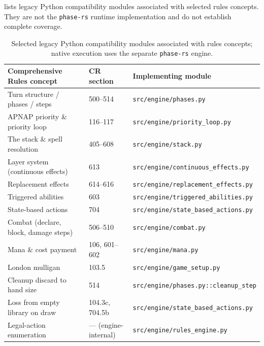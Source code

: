 \documentclass[11pt,a4paper]{article}
\theoremstyle{definition}
\theoremstyle{plain}
\begin{document}
 lists legacy Python compatibility modules associated with selected rules concepts. They are not the \texttt{phase-rs} runtime implementation and do not establish complete coverage.

\begin{table}[t]
\centering
\small
\setlength{\tabcolsep}{4pt}
\renewcommand{\arraystretch}{1.05}
\begin{tabular}{@{}p{} p{} p{}@{}}
\toprule
\textbf{Comprehensive Rules concept} & \textbf{CR section} & \textbf{Implementing module} \\
\midrule
Turn structure / phases / steps          & 500--514         & \texttt{src/engine/phases.py} \\
APNAP priority \& priority loop          & 116--117         & \texttt{src/engine/priority\_loop.py} \\
The stack \& spell resolution            & 405--608         & \texttt{src/engine/stack.py} \\
Layer system (continuous effects)        & 613              & \texttt{src/engine/continuous\_effects.py} \\
Replacement effects                      & 614--616         & \texttt{src/engine/replacement\_effects.py} \\
Triggered abilities                      & 603              & \texttt{src/engine/triggered\_abilities.py} \\
State-based actions                      & 704              & \texttt{src/engine/state\_based\_actions.py} \\
Combat (declare, block, damage steps)    & 506--510         & \texttt{src/engine/combat.py} \\
Mana \& cost payment                     & 106, 601--602    & \texttt{src/engine/mana.py} \\
London mulligan                          & 103.5            & \texttt{src/engine/game\_setup.py} \\
Cleanup discard to hand size             & 514              & \texttt{src/engine/phases.py::cleanup\_step} \\
Loss from empty library on draw          & 104.3c, 704.5b   & \texttt{src/engine/state\_based\_actions.py} \\
Legal-action enumeration                 & --- (engine-internal) & \texttt{src/engine/rules\_engine.py} \\
\bottomrule
\end{tabular}
\caption{Selected legacy Python compatibility modules associated with rules concepts; native execution uses the separate \texttt{phase-rs} engine.}
\label{tab:engine-pointers}
\end{table}
\end{document}
